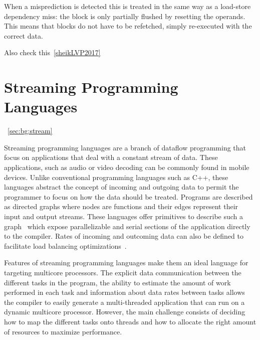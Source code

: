 When a misprediction is detected this is treated in the same way as a load-store dependency miss: the block is only partially flushed by resetting the operands.
This means that blocks do not have to be refetched, simply re-executed with the correct data.

Also check this~\ref{sheikLVP2017}

\section{Streaming Programming Languages}~\ref{sec:bg:stream}


Streaming programming languages are a branch of dataflow programming that focus on applications that deal with a constant stream of data.
These applications, such as audio or video decoding can be commonly found in mobile devices.
Unlike conventional programming languages such as C++, these languages abstract the concept of incoming and outgoing data to permit the programmer to focus on how the data should be treated.
Programs are described as directed graphs where nodes are functions and their edges represent their input and output streams. 
These languages offer primitives to describe such a graph~\cite{theis2002streamit} which expose parallelizable and serial sections of the application directly to the compiler. 
Rates of incoming and outcoming data can also be defined to facilitate load balancing optimizations~\cite{chen2005rawstream}.

Features of streaming programming languages make them an ideal language for targeting multicore processors.
The explicit data communication between the different tasks in the program, the ability to estimate the amount of work performed in each task and information about data rates between tasks allows the compiler to easily generate a multi-threaded application that can run on a dynamic multicore processor.
However, the main challenge consists of deciding how to map the different tasks onto threads and how to allocate the right amount of resources to maximize performance.



